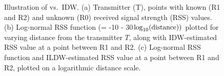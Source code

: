 


\begin{figure}
	\centering
	\qquad
	\newline
        \hspace{0.3in}
      	\caption{Illustration of \ildw vs.\ IDW.
          (a) Transmitter (T), points with known (R1 and R2) and unknown (R0) received signal strength (RSS) values.
          (b) Log-normal RSS function (= -10 - 30$\log_{10}({\rm distance}))$
          plotted for varying distance from the transmitter $T$, along
          with IDW-estimated RSS value at a point between R1 and R2.
          (c) Log-normal RSS function and ILDW-estimated RSS value at
          a point between R1 and R2, plotted on a logarithmic distance
          scale.}
	  \label{fig:ildw}
\end{figure}




